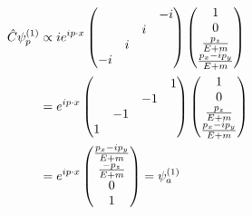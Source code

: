 \begin{align}
    \Hat{C}\psi^{(1)}_p&\propto ie^{ip\cdot x}\begin{pmatrix}
        &&&-i\\
        &&i&\\
        &i&&\\
        -i&&&
    \end{pmatrix}\begin{pmatrix}
        1\\
        0\\
        \frac{p_z}{E+m}\\
        \frac{p_x-ip_y}{E+m}
    \end{pmatrix}\nonumber\\
    &=e^{ip\cdot x}\begin{pmatrix}
        &&&1\\
        &&-1&\\
        &-1&&\\
        1&&&
    \end{pmatrix}\begin{pmatrix}
        1\\
        0\\
        \frac{p_z}{E+m}\\
        \frac{p_x-ip_y}{E+m}
    \end{pmatrix}\nonumber\\
    &=e^{ip\cdot x}\begin{pmatrix}
        \frac{p_x-ip_y}{E+m}\\
        \frac{-p_z}{E+m}\\
        0\\
        1
    \end{pmatrix}=\psi^{(1)}_a
\end{align}

